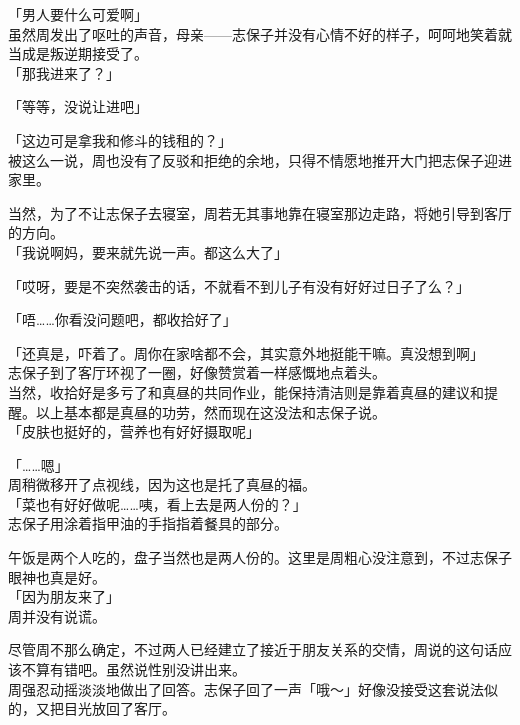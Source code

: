 「男人要什么可爱啊」\\

虽然周发出了呕吐的声音，母亲——志保子并没有心情不好的样子，呵呵地笑着就当成是叛逆期接受了。\\

「那我进来了？」

「等等，没说让进吧」

「这边可是拿我和修斗的钱租的？」\\

被这么一说，周也没有了反驳和拒绝的余地，只得不情愿地推开大门把志保子迎进家里。

当然，为了不让志保子去寝室，周若无其事地靠在寝室那边走路，将她引导到客厅的方向。\\

「我说啊妈，要来就先说一声。都这么大了」

「哎呀，要是不突然袭击的话，不就看不到儿子有没有好好过日子了么？」

「唔……你看没问题吧，都收拾好了」

「还真是，吓着了。周你在家啥都不会，其实意外地挺能干嘛。真没想到啊」\\

志保子到了客厅环视了一圈，好像赞赏着一样感慨地点着头。\\

当然，收拾好是多亏了和真昼的共同作业，能保持清洁则是靠着真昼的建议和提醒。以上基本都是真昼的功劳，然而现在这没法和志保子说。\\

「皮肤也挺好的，营养也有好好摄取呢」

「……嗯」\\

周稍微移开了点视线，因为这也是托了真昼的福。\\

「菜也有好好做呢……咦，看上去是两人份的？」\\

志保子用涂着指甲油的手指指着餐具的部分。

午饭是两个人吃的，盘子当然也是两人份的。这里是周粗心没注意到，不过志保子眼神也真是好。\\

「因为朋友来了」\\

周并没有说谎。

尽管周不那么确定，不过两人已经建立了接近于朋友关系的交情，周说的这句话应该不算有错吧。虽然说性别没讲出来。\\

周强忍动摇淡淡地做出了回答。志保子回了一声「哦～」好像没接受这套说法似的，又把目光放回了客厅。

